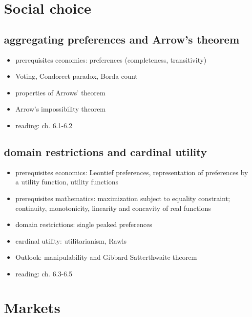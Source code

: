\documentclass[11pt]{article}
\author{Christoph Schottmüller}
\date{\today}
\title{}
\begin{document}
\section{Social choice}
\label{sec:org676e43f}
\subsection{aggregating preferences and Arrow's theorem}
\label{sec:org83c1087}
\begin{itemize}
\item prerequisites economics: preferences (completeness, transitivity)
\item Voting, Condorcet paradox, Borda count
\item properties of Arrows' theorem
\item Arrow's impossibility theorem
\item reading: \cite{jehle2001advanced} ch. 6.1-6.2
\end{itemize}

\subsection{domain restrictions and cardinal utility}
\label{sec:orgc9219bc}
\begin{itemize}
\item prerequisites economics:  Leontief preferences, representation of preferences by a utility function, utility functions
\item prerequisites mathematics: maximization subject to equality constraint; continuity, monotonicity, linearity and concavity of real functions
\item domain restrictions: single peaked preferences
\item cardinal utility: utilitarianism, Rawls
\item Outlook: manipulability and Gibbard Satterthwaite theorem
\item reading: \cite{jehle2001advanced} ch. 6.3-6.5
\end{itemize}

\section{Markets}
\label{sec:org81b2eb1}
\end{document}

